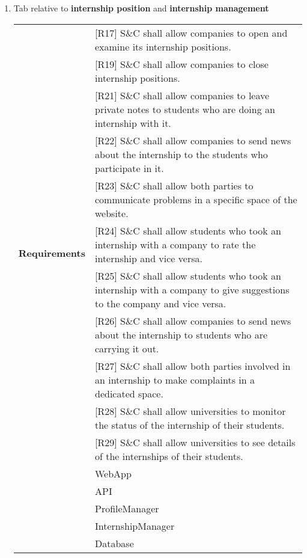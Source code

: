 \begin{enumerate}
    \newpage
    \item Tab relative to \textbf{internship position }and \textbf{ internship management}
    \begin{center}
        \begin{tabular}{ |p{4cm}|p{10cm}| } 
        \hline
        \multirow{12}{6em}{\textbf{Requirements}} 
        & [R17] S\&C shall allow companies to open and examine its internship positions. \\
        & [R19] S\&C shall allow companies to close internship positions. \\
        & [R21] S\&C shall allow companies to leave private notes to students who are doing an internship with it. \\
        & [R22] S\&C shall allow companies to send news about the internship to the students who participate in it. \\
        & [R23] S\&C shall allow both parties to communicate problems in a specific space of the website. \\
        & [R24] S\&C shall allow students who took an internship with a company to rate the internship and vice versa. \\
        & [R25] S\&C shall allow students who took an internship with a company to give suggestions to the company and vice versa. \\
        & [R26] S\&C shall allow companies to send news about the internship to students who are carrying it out. \\
        & [R27] S\&C shall allow both parties involved in an internship to make complaints in a dedicated space. \\
        & [R28] S\&C shall allow universities to monitor the status of the internship of their students. \\
        & [R29] S\&C shall allow universities to see details of the internships of their students. \\
        \hline
        \multirow{5}{6em}{\textbf{Components}} 
        & WebApp \\ 
        & API \\ 
        & ProfileManager \\ 
        & InternshipManager \\
        & Database \\
        \hline
        \end{tabular}
    \end{center}

\end{enumerate}